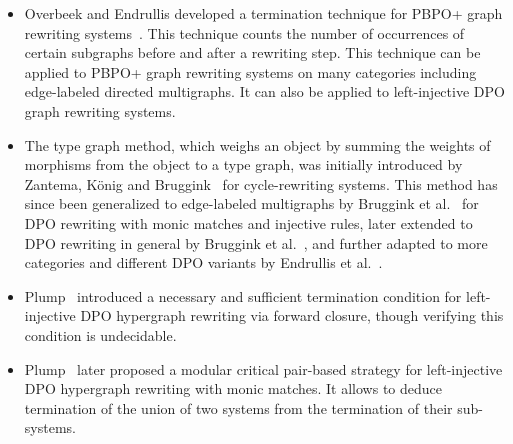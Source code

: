 \begin{itemize}
    \item Overbeek and Endrullis developed a termination technique for PBPO+ graph rewriting systems~\cite{overbeek2024termination_lmcs}. This technique counts the number of occurrences of certain subgraphs before and after a rewriting step. This technique can be applied to PBPO+ graph rewriting systems on many categories including edge-labeled directed multigraphs. It can also be applied to left-injective DPO graph rewriting systems.
    \item The type graph method, which weighs an object by summing the weights of morphisms from the object to a type graph, was initially introduced by Zantema, K{\"o}nig and Bruggink~\cite{zantema2014termination} for cycle-rewriting systems. 
    This method has since been generalized to edge-labeled multigraphs by Bruggink et al.~\cite{bruggink2014termination} for DPO rewriting with monic matches and injective rules, later extended to DPO rewriting in general by Bruggink et al.~\cite{bruggink2015proving}, and further adapted to more categories and different DPO variants by Endrullis et al.~\cite{endrullis2024generalized_arxiv_v2}. 
    \item Plump~\cite{plump1995ontermination} introduced a necessary and sufficient termination condition for left-injective DPO hypergraph rewriting via forward closure, though verifying this condition is undecidable. 
    \item Plump~\cite{plump2018modular} later proposed a modular critical pair-based strategy for left-injective DPO hypergraph rewriting with monic matches. It allows to deduce termination of the union of two systems from the termination of their sub-systems.
\end{itemize}


